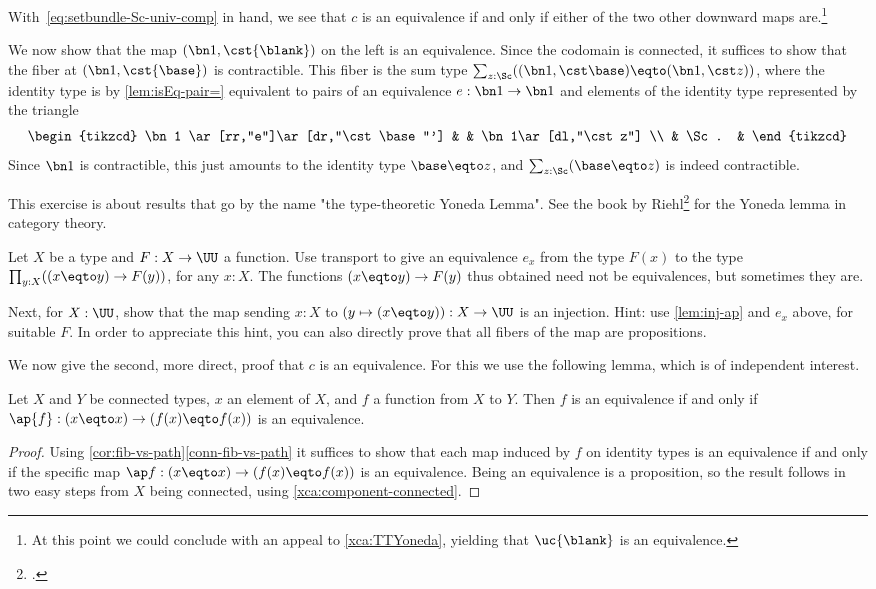 With~\eqref{eq:setbundle-Sc-univ-comp} in hand, we see that $c$ is an equivalence
if and only if either of the two other downward maps are.\footnote{%
  At this point we could conclude with an appeal to \cref{xca:TTYoneda},
  yielding that $\uc{\blank}$ is an equivalence.}
  

We now show that the map $(\bn 1,\cst{\blank})$
on the left is an equivalence. Since the codomain is connected,
it suffices to show that the fiber at $(\bn 1,\cst{\base})$ is contractible.
This fiber is the sum type $\sum_{z:\Sc}((\bn 1,\cst \base)\eqto(\bn 1,\cst z))$,
where the identity type is by \cref{lem:isEq-pair=} equivalent to pairs of
an equivalence $e : \bn 1 \to \bn 1$ and elements of the identity type
represented by the triangle
\[
  \begin{tikzcd}
    \bn 1 \ar[rr,"e"]\ar[dr,"\cst \base"'] & & \bn 1\ar[dl,"\cst z"] \\
    & \Sc. &
  \end{tikzcd}
\]
Since $\bn 1$ is contractible, this just amounts to the identity type
$\base\eqto z$, and $\sum_{z:\Sc}(\base\eqto z)$ is indeed contractible.

\begin{xca}\label{xca:TTYoneda}
This exercise is about results that go by the name "the type-theoretic
Yoneda Lemma". See the book by Riehl\footcite{RiehlContext} 
for the Yoneda lemma in category theory.

Let $X$ be a type and $F: X\to\UU$ a function. Use transport
to give an equivalence $e_x$ from the type $F(x)$ to the type 
$\prod_{y:X} ((x\eqto y) \to F(y))$, for any $x:X$. 
The functions $(x\eqto y) \to F(y)$ 
thus obtained need not be equivalences, but sometimes they are.

Next, for $X:\UU$, show that the map sending
$x:X$ to $(y \mapsto (x\eqto y)) : X\to\UU$ is an injection.
Hint: use \cref{lem:inj-ap} and $e_x$ above, for suitable $F$. In order
to appreciate this hint, you can also directly prove that all fibers
of the map are propositions.
\end{xca}

We now give the second, more direct, proof that $c$ is an equivalence.
For this we use the following lemma, which is of independent interest.
\begin{lemma}\label{lem:conn-eq-f-ap-f-x}
Let $X$ and $Y$ be connected types, $x$ an element of $X$,
and $f$ a function from $X$ to $Y$. Then $f$ is an equivalence
if and only if $\ap{f}: (x\eqto x) \to (f(x)\eqto f(x))$ is an equivalence.
\end{lemma}
\begin{proof}
Using \cref{cor:fib-vs-path}\ref{conn-fib-vs-path} it suffices to show that
each map induced by $f$ on identity types is an equivalence if and only if the specific map
$\ap f : (x\eqto x) \to (f(x) \eqto f(x))$ is an equivalence.
Being an equivalence is a proposition,
so the result follows in two easy steps from $X$ being connected,
using \cref{xca:component-connected}.
\end{proof}

